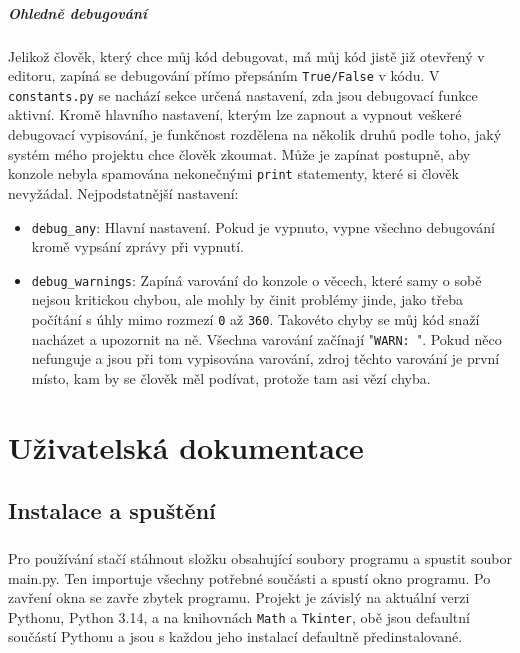\documentclass[12pt,a4paper]{report}
\begin{document}
\paragraph{Ohledně debugování}
\enlargethispage{2\baselineskip}
\paragraph{} Jelikož člověk, který chce můj kód debugovat, má můj kód jistě již otevřený v editoru, zapíná se debugování přímo přepsáním \lstinline{True/False} v kódu. V \lstinline{constants.py} se nachází sekce určená nastavení, zda jsou debugovací funkce aktivní. Kromě hlavního nastavení, kterým lze zapnout a vypnout veškeré debugovací vypisování, je funkčnost rozdělena na několik druhů podle toho, jaký systém mého projektu chce člověk zkoumat. Může je zapínat postupně, aby konzole nebyla spamována nekonečnými \lstinline{print} statementy, které si člověk nevyžádal. Nejpodstatnější nastavení:
\begin{itemize}
    \item \lstinline{debug_any}: Hlavní nastavení. Pokud je vypnuto, vypne všechno debugování kromě vypsání zprávy při vypnutí.
    \item \lstinline{debug_warnings}: Zapíná varování do konzole o věcech, které samy o sobě nejsou kritickou chybou, ale mohly by činit problémy jinde, jako třeba počítání s úhly mimo rozmezí \lstinline{0} až \lstinline{360}. Takovéto chyby se můj kód snaží nacházet a upozornit na ně. Všechna varování začínají \newline"\lstinline{WARN: }". Pokud něco nefunguje a jsou při tom vypisována varování, zdroj těchto varování je první místo, kam by se člověk měl podívat, protože tam asi vězí chyba.
\end{itemize}

\chapter{Uživatelská dokumentace}
\section{Instalace a spuštění}
\paragraph{} Pro používání stačí stáhnout složku obsahující soubory programu a spustit soubor main.py. Ten importuje všechny potřebné součásti a spustí okno programu. Po zavření okna se zavře zbytek programu.
Projekt je závislý na aktuální verzi Pythonu, Python 3.14, a na knihovnách \lstinline{Math} a \lstinline{Tkinter}, obě jsou defaultní součástí Pythonu a jsou s každou jeho instalací defaultně předinstalované.
\end{document}
